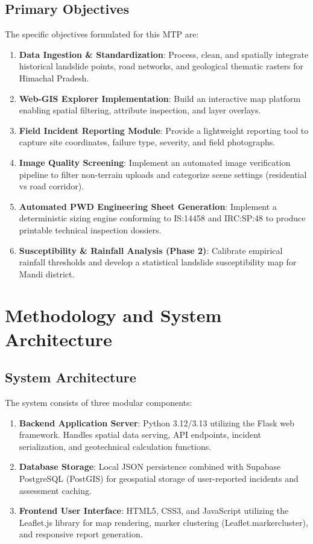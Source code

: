 \documentclass[12pt,a4paper]{report}
\begin{document}
\section{Primary Objectives}
The specific objectives formulated for this MTP are:
\begin{enumerate}
    \item \textbf{Data Ingestion \& Standardization}: Process, clean, and spatially integrate historical landslide points, road networks, and geological thematic rasters for Himachal Pradesh.
    \item \textbf{Web-GIS Explorer Implementation}: Build an interactive map platform enabling spatial filtering, attribute inspection, and layer overlays.
    \item \textbf{Field Incident Reporting Module}: Provide a lightweight reporting tool to capture site coordinates, failure type, severity, and field photographs.
    \item \textbf{Image Quality Screening}: Implement an automated image verification pipeline to filter non-terrain uploads and categorize scene settings (residential vs road corridor).
    \item \textbf{Automated PWD Engineering Sheet Generation}: Implement a deterministic sizing engine conforming to IS:14458 and IRC:SP:48 to produce printable technical inspection dossiers.
    \item \textbf{Susceptibility \& Rainfall Analysis (Phase 2)}: Calibrate empirical rainfall thresholds and develop a statistical landslide susceptibility map for Mandi district.
\end{enumerate}

\newpage

\chapter{Methodology and System Architecture}

\section{System Architecture}
The system consists of three modular components:
\begin{enumerate}
    \item \textbf{Backend Application Server}: Python 3.12/3.13 utilizing the Flask web framework. Handles spatial data serving, API endpoints, incident serialization, and geotechnical calculation functions.
    \item \textbf{Database Storage}: Local JSON persistence combined with Supabase PostgreSQL (PostGIS) for geospatial storage of user-reported incidents and assessment caching.
    \item \textbf{Frontend User Interface}: HTML5, CSS3, and JavaScript utilizing the Leaflet.js library for map rendering, marker clustering (Leaflet.markercluster), and responsive report generation.
\end{enumerate}
\end{document}

